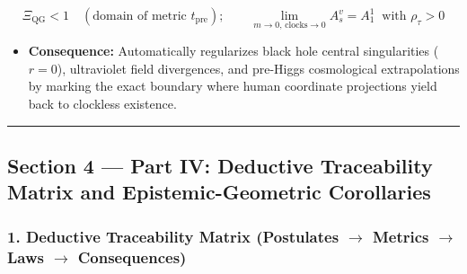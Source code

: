 \documentclass[
]{article}
\providecommand{\tightlist}{%
  \setlength{\itemsep}{0pt}\setlength{\parskip}{0pt}}
\begin{document}
\[\Xi_{\mathrm{QG}} < 1 \quad (\text{domain of metric } t_{\mathrm{pre}}); \qquad \lim_{m \to 0,\,\text{clocks} \to 0} A_s^v = A_1^1 \;\; \text{with } \rho_\tau > 0\]

\begin{itemize}
\tightlist
\item
  \textbf{Consequence:} Automatically regularizes black hole central
  singularities (\(r = 0\)), ultraviolet field divergences, and
  pre-Higgs cosmological extrapolations by marking the exact boundary
  where human coordinate projections yield back to clockless existence.
\end{itemize}

\begin{center}\rule{0.5\linewidth}{0.5pt}\end{center}

\subsection{Section 4 --- Part IV: Deductive Traceability Matrix and
Epistemic-Geometric
Corollaries}\label{section-4-part-iv-deductive-traceability-matrix-and-epistemic-geometric-corollaries}

\subsubsection{\texorpdfstring{1. Deductive Traceability Matrix
(Postulates \(\to\) Metrics \(\to\) Laws \(\to\)
Consequences)}{1. Deductive Traceability Matrix (Postulates \textbackslash to Metrics \textbackslash to Laws \textbackslash to Consequences)}}\label{deductive-traceability-matrix-postulates-to-metrics-to-laws-to-consequences}
\end{document}
